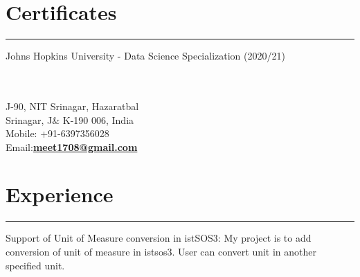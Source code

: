 \documentclass[]{meetresume-class}
\begin{document}
\begin{minipage}[t]{0.33\textwidth}
		\section{Certificates}
		\noindent\rule{5cm}{0.6pt}
		
		Johns Hopkins University - Data Science Specialization (2020/21)\\
		
	\end{minipage} 
	\hfill
	\begin{minipage}[t]{0.66\textwidth} 
		\hspace*{0pt}\hfill    \\
		\hspace*{0pt}\hfill    \\
		\hspace*{0pt}\hfill J-90, NIT Srinagar, Hazaratbal \\
		\hspace*{0pt}\hfill Srinagar, J$\&$ K-190 006, India \\
		\hspace*{0pt}\hfill Mobile: +91-6397356028 \\
		\hspace*{0pt}\hfill Email:\textbf{\href{mailto:meet1708@gmail.com}{meet1708@gmail.com}} \\
		\hspace*{0pt}\hfill %
		\section{Experience}
		\noindent\rule{12.5cm}{0.4pt}
		 
		\noindent
		\hspace{5em}%
		\begin{minipage}{0.85\textwidth\vspace{2pt}}
			Support of Unit of Measure conversion in istSOS3: My project is to add conversion of
			unit of measure in istsos3. User can convert unit in another specified unit.
		\end{minipage}
		\sectionsep
		

\end{minipage}
\end{document}
